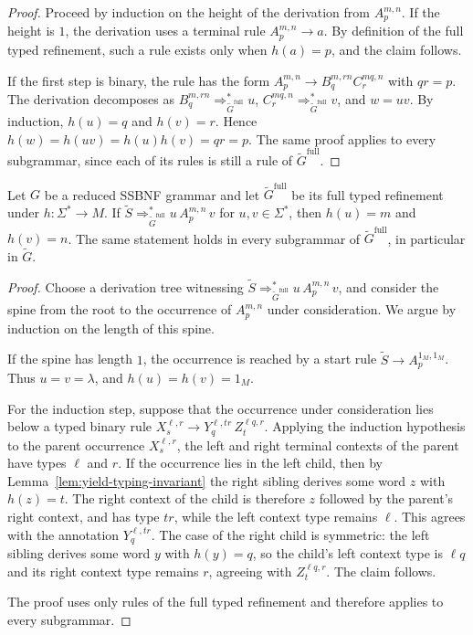 \documentclass[sub]{jalc}
\newcommand{\eM}{1_M}
\newcommand{\Gfull}{\widetilde G^{\mathrm{full}}}
\newcommand{\Gtrim}{\widetilde G}
\begin{document}
\begin{proof}
Proceed by induction on the height of the derivation from \(A_p^{m,n}\). If the height is \(1\), the derivation uses a terminal rule \(A_p^{m,n}\to a\). By definition of the full typed refinement, such a rule exists only when \(h(a)=p\), and the claim follows.

If the first step is binary, the rule has the form \(A_p^{m,n}\to B_q^{m,rn}C_r^{mq,n}\) with \(qr=p\). The derivation decomposes as \(B_q^{m,rn}\Rightarrow_{\Gfull}^* u\), \(C_r^{mq,n}\Rightarrow_{\Gfull}^* v\), and \(w=uv\). By induction, \(h(u)=q\) and \(h(v)=r\). Hence \(h(w)=h(uv)=h(u)h(v)=qr=p\). The same proof applies to every subgrammar, since each of its rules is still a rule of \(\Gfull\).
\end{proof}

\begin{lemma}
\label{lem:context-typing-invariant}
Let \(G\) be a reduced SSBNF grammar and let \(\Gfull\) be its full typed refinement under \(h:\Sigma^*\to M\). If \(\widetilde S\Rightarrow_{\Gfull}^* u\,A_p^{m,n}\,v\) for \(u,v\in\Sigma^*\), then \(h(u)=m\) and \(h(v)=n\). The same statement holds in every subgrammar of \(\Gfull\), in particular in \(\Gtrim\).
\end{lemma}

\begin{proof}
Choose a derivation tree witnessing \(\widetilde S\Rightarrow_{\Gfull}^* u\,A_p^{m,n}\,v\), and consider the spine from the root to the occurrence of \(A_p^{m,n}\) under consideration. We argue by induction on the length of this spine.

If the spine has length \(1\), the occurrence is reached by a start rule \(\widetilde S\to A_p^{\eM,\eM}\). Thus \(u=v=\lambda\), and \(h(u)=h(v)=\eM\).

For the induction step, suppose that the occurrence under consideration lies below a typed binary rule \(X_s^{\ell,r}\to Y_q^{\ell,tr}\,Z_t^{\ell q,r}\). Applying the induction hypothesis to the parent occurrence \(X_s^{\ell,r}\), the left and right terminal contexts of the parent have types \(\ell\) and \(r\). If the occurrence lies in the left child, then by Lemma~\ref{lem:yield-typing-invariant} the right sibling derives some word \(z\) with \(h(z)=t\). The right context of the child is therefore \(z\) followed by the parent's right context, and has type \(tr\), while the left context type remains \(\ell\). This agrees with the annotation \(Y_q^{\ell,tr}\). The case of the right child is symmetric: the left sibling derives some word \(y\) with \(h(y)=q\), so the child's left context type is \(\ell q\) and its right context type remains \(r\), agreeing with \(Z_t^{\ell q,r}\). The claim follows.

The proof uses only rules of the full typed refinement and therefore applies to every subgrammar.
\end{proof}
\end{document}
